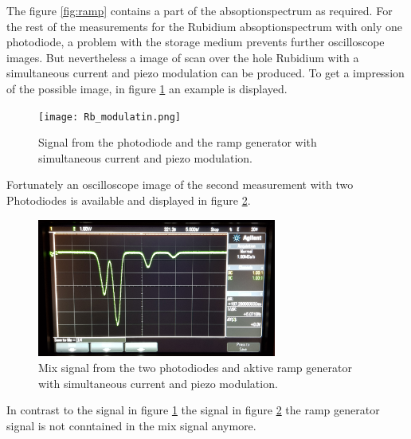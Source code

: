 The figure \ref{fig:ramp} contains a part of the
absoptionspectrum as required.
For the rest of the measurements for the Rubidium absoptionspectrum
with only one photodiode, a problem with the storage medium
prevents further oscilloscope images.
But nevertheless
a image of scan over the hole Rubidium
with a simultaneous current and piezo modulation
can be produced. To get a impression of the possible image,
in figure \ref{fig:theory_curve} an example is displayed.

\begin{figure}
  \centering
  \texttt{[image: Rb\_modulatin.png]}
  \caption{Signal from the photodiode and the ramp generator with
  simultaneous current and piezo modulation. \cite{V60}}
  \label{fig:theory_curve}
\end{figure}

Fortunately an oscilloscope image of the second measurement
with two Photodiodes
is available and displayed in figure \ref{fig:2dioden}.

\begin{figure}
  \centering
  \includegraphics[width = 0.7\textwidth]{./figures/Rb_spectrum.jpg}
  \caption{Mix signal from the two photodiodes and aktive ramp generator with
  simultaneous current and piezo modulation.}
  \label{fig:2dioden}
\end{figure}

In contrast to the signal in figure \ref{fig:theory_curve}
the signal in figure \ref{fig:2dioden} the
ramp generator signal is not conntained in the mix signal anymore.
